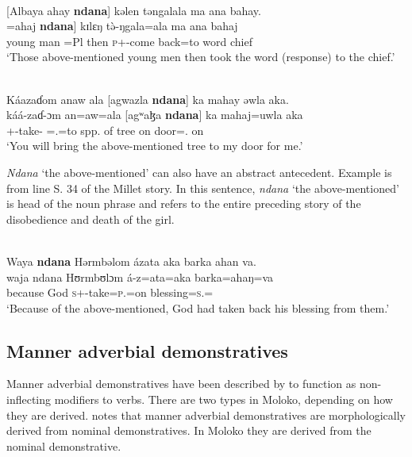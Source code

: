 \ea \label{ex:3:66}\\
{[}Albaya  ahay  \textbf{ndana}]  kəlen  təngalala  ma  ana  bahay.\\
\gll {[albaja}   =ahaj  \textbf{ndana}]  kɪlɛŋ  t\`{ə}-ŋgala=ala   ma  ana   bahaj\\
     {young man}    =Pl         {\DEM}  then  {\textsc{p}+{\PFV}-come back}=to  word  {\DAT} chief\\ 
\glt ‘Those above-mentioned young men then took the word (response) to the chief.’
\z

\ea \label{ex:3:67}\\
Káazaɗom  anaw  ala  [agwazla  \textbf{ndana}]  ka  mahay  əwla  aka.\\
\gll káá-zaɗ{}-ɔm    an=aw=ala  [agʷaɮa  \textbf{ndana}]  ka  mahaj=uwla   aka  \\
    {\twoP}+{\POT}-take-{\twoP}  {\DAT}={\oneS}.{\IO}=to    {spp. of tree}  {\DEM}  on       door={\oneS}.{\POSS}  on\\
\glt ‘You will bring the above-mentioned tree to my door for me.’
\z

\textit{Ndana} ‘the above-mentioned’ can also have an abstract antecedent. Example  is from line S. 34 of the Millet story. In this sentence, \textit{ndana}  ‘the above-mentioned’ is head of the noun phrase and refers to the entire preceding story of the disobedience and death of the girl. 

\ea \label{ex:3:68}\\
Waya  \textbf{ndana}  Hərmbəlom  ázata  aka  barka  ahan  va.\\
\gll  waja   ndana  Hʊrmbʊlɔm   á-z=ata=aka   barka=ahaŋ=va   \\
      because   {\DEM}   God             \textsc{s}+{\IFV}-take=\textsc{p}.{\IO}=on   blessing=\textsc{s}.{\POSS}={\PRF}  \\
\glt  ‘Because of the above-mentioned, God had taken back his blessing from them.’
\z

\subsection{Manner adverbial demonstratives}\label{sec:3.2.3}
\hypertarget{RefHeading1211001525720847}{}
Manner adverbial demonstratives have been described by \citet{Dixon2003} to function as non-inflecting modifiers to verbs. There are two types in Moloko, depending on how they are derived. \citet{Dixon2003} notes that manner adverbial demonstratives are morphologically derived from nominal demonstratives. In Moloko they are derived from the nominal demonstrative. 

